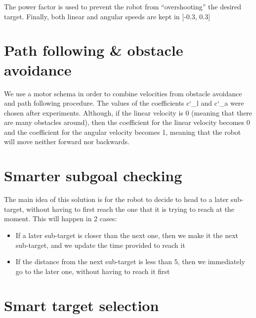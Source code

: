 \documentclass[letterpaper,12pt]{article}
\begin{document}
The power factor is used to prevent the robot from “overshooting” the desired target.  Finally, both linear and angular speeds are kept in [-0.3, 0.3]

\section{Path following \& obstacle avoidance}


\vspace{2mm} %

We use a motor schema in order to combine velocities from obstacle avoidance and path following procedure. The values of the coefficients c\char`_l and c\char`_a were chosen after experiments. Although, if the linear velocity is 0 (meaning  that there are many obstacles around), then the coefficient for the linear velocity becomes 0 and the coefficient for the angular velocity becomes 1, meaning that the robot will move neither forward nor backwards.

\newpage

\section{Smarter subgoal checking}


\vspace{2mm} %

The main idea of this solution is for the robot to decide to head to a later sub-target, without having to first reach the one that it is trying to reach at the moment. This will happen in 2 cases:
\begin{itemize}
	\item If a later sub-target is closer than the next one, then we make it the next sub-target, and we update the time provided to reach it
	\item If the distance from the next sub-target is less than 5, then we immediately go to the later one, without having to reach it first
\end{itemize}

\newpage

\section{Smart target selection}
\end{document}
